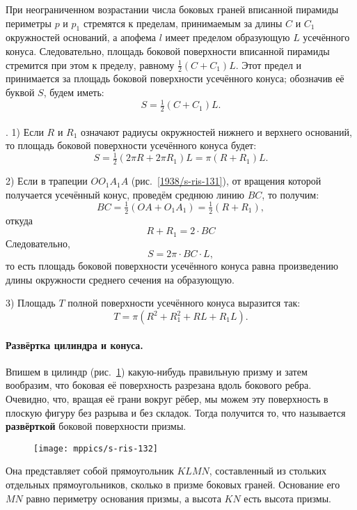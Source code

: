 При неограниченном возрастании числа боковых граней вписанной пирамиды периметры $p$ и $p_1$ стремятся к пределам, принимаемым за длины $C$ и $C_1$ окружностей оснований, а апофема $l$ имеет пределом образующую $L$ усечённого конуса.
Следовательно, площадь боковой поверхности вписанной пирамиды стремится при этом к пределу, равному $\tfrac12(C + C_1)L$.
Этот предел и принимается за площадь боковой поверхности усечённого конуса;
обозначив её буквой $S$, будем иметь:
\[S=\tfrac12 (C+C_1)L.\]

\paragraph{}\label{1938/s117}
. 1) Если $R$ и $R_1$ означают радиусы окружностей нижнего и верхнего оснований, то площадь боковой поверхности усечённого конуса будет:
\[S = \tfrac12(2\pi R + 2\pi R_1)L = \pi (R + R_1)L.\]

2) Если в трапеции $OO_1A_1A$ (рис.~\ref{1938/s-ris-131}), от вращения которой получается усечённый конус, проведём среднюю линию $BC$, то получим:
\[BC = \tfrac12(OA + O_1A_1) = \tfrac12(R + R_1),\]
откуда
\[R + R_1=2\cdot BC\]
Следовательно,
\[S = 2\pi\cdot BC\cdot L,\]
то есть площадь боковой поверхности усечённого конуса равна произведению длины окружности среднего сечения на образующую.

3) Площадь $T$ полной поверхности усечённого конуса выразится так:
\[T = \pi (R^2 + R_1^2 + RL + R_1L).\]

\paragraph{Развёртка цилиндра и конуса.}\label{1938/s118}
Впишем в цилиндр (рис.~\ref{1938/s-ris-132}) какую-нибудь правильную призму и затем вообразим, что боковая её поверхность разрезана вдоль бокового ребра.
Очевидно, что, вращая её грани вокруг рёбер, мы можем  эту поверхность в плоскую фигуру без разрыва и без складок.
Тогда получится то, что называется \textbf{развёрткой} боковой поверхности призмы.
\begin{figure}[h!]
\vskip-0mm
\centering
\texttt{[image: mppics/s-ris-132]}
\caption{}\label{1938/s-ris-132}
\vskip-0mm
\end{figure}
Она представляет собой прямоугольник $KLMN$, составленный из стольких отдельных прямоугольников, сколько в призме боковых граней.
Основание его $MN$ равно периметру основания призмы, а высота $KN$ есть высота призмы.

